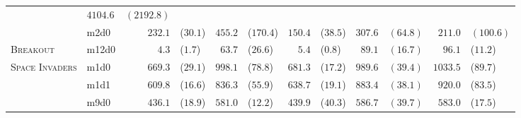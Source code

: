 \begin{tabular}{ll rl rl rl rl rl}
& $4104.6$ & $(2192.8)$ \\ \cmidrule(l){2-12}

& m2d0
& $232.1$ & ($30.1$) %
& $455.2$ & ($170.4$) %

& $150.4$ & ($38.5$) %
& $307.6$ & $(64.8)$ %

& $211.0$ & $(100.6)$ \\ \cmidrule[0.2mm]{1-12}

\multirow{1}{*}{\textsc{Breakout}}
& m12d0
& $4.3$ & ($1.7$) %
& $63.7$ & ($26.6$) %

& $5.4$ & ($0.8$) %
& $89.1$ & $(16.7)$ %

& $96.1$ & ($11.2$) \\ \cmidrule[0.2mm]{1-12}

\multirow{3}{*}{\textsc{Space Invaders}}

& m1d0
& $669.3$ & ($29.1$) %
& $998.1$ & ($78.8$) %

& $681.3$ & ($17.2$) %
& $989.6$ & $(39.4)$ %

& $1033.5$ & ($89.7$) \\ \cmidrule(l){2-12}

& m1d1
& $609.8$ & ($16.6$) %
& $836.3$ & ($55.9$) %

& $638.7$ & ($19.1$) %
& $883.4$ & $(38.1)$ %

& $920.0$ & ($83.5$) \\ \cmidrule(l){2-12}

& m9d0
& $436.1$ & ($18.9$) %
& $581.0$ & ($12.2$) %

& $439.9$ & ($40.3$) %
& $586.7$ & $(39.7)$ %

& $583.0$ & ($17.5$) \\
\end{tabular}
